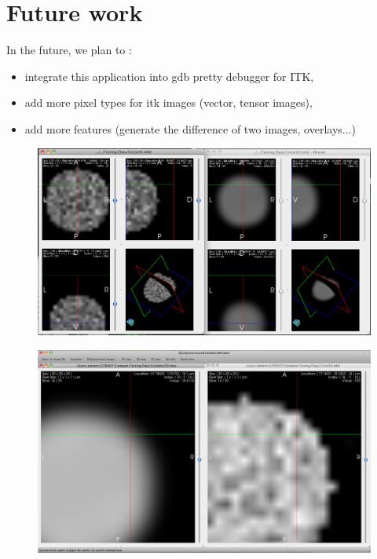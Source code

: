 \documentclass{InsightArticle}
\begin{document}
\section{Future work}
In the future, we plan to :
\begin{itemize}
  \item integrate this application into gdb pretty debugger for ITK,
  \item add more pixel types for itk images (vector, tensor images),
  \item add more features (generate the difference of two images, overlays...)
\end{itemize}

\begin{figure}[p]
\center
\includegraphics[width=1\textwidth]{images/quadcompare}
\label{fig:ImageCompareGUIquad}
\end{figure}

\begin{figure}[p]
\center
\includegraphics[width=1\textwidth]{images/xycompare}
\label{fig:ImageCompareGUIXY}
\end{figure}

\clearpage



\end{document}
